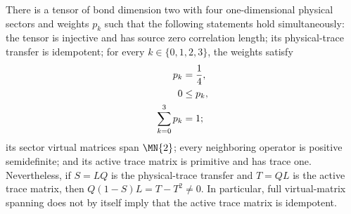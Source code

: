 \begin{lemma}
    \label{thm:mpdo_virtual_spanning_active_trace_counterexample}
    \leanok
    There is a tensor of bond dimension two with four one-dimensional physical
    sectors and weights $p_k$ such that the following statements hold
    simultaneously: the tensor is injective and has source zero correlation
    length; its physical-trace transfer is idempotent; for every
    $k\in\{0,1,2,3\}$, the weights satisfy
    \begin{align}
        p_k               & =\frac14,
        \notag                        \\
        0                 & \leq p_k,
        \notag                        \\
        \sum_{k=0}^{3}p_k & =1;
        \notag
    \end{align}
    its sector virtual matrices span $\MN{2}$; every neighboring operator is
    positive semidefinite; and its active trace matrix is primitive and has
    trace one. Nevertheless, if
    $S=LQ$ is the physical-trace transfer and $T=QL$ is the active trace matrix,
    then $Q(1-S)L=T-T^2\ne0$. In particular, full virtual-matrix spanning does
    not by itself imply that the active trace matrix is idempotent.
\end{lemma}

